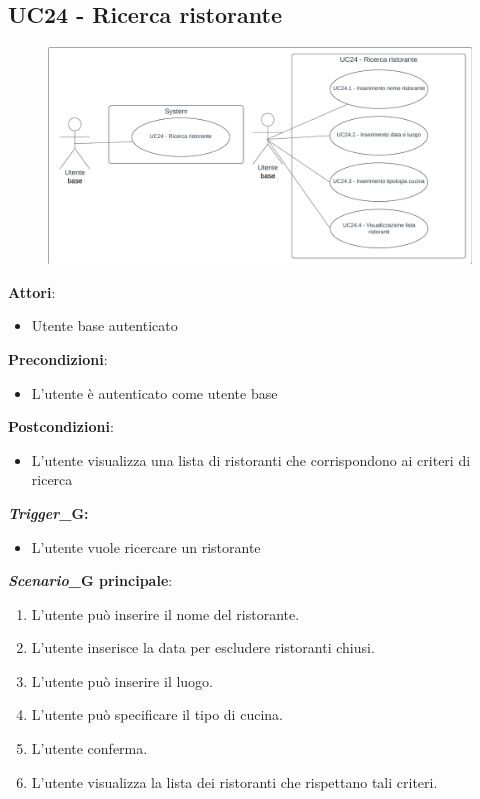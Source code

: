 \subsection{UC24 - Ricerca ristorante}\label{usecase:24}

\begin{figure}[H]
    \centering
    \includegraphics[width=0.9\linewidth]{ucd/UCD24.png}
\end{figure}

\textbf{Attori}:
\begin{itemize}
    \item Utente base autenticato
\end{itemize}
\textbf{Precondizioni}:
\begin{itemize}
    \item L'utente è autenticato come utente base
\end{itemize}
\textbf{Postcondizioni}:
\begin{itemize}
    \item L'utente visualizza una lista di ristoranti che corrispondono ai criteri di ricerca
\end{itemize}
\textbf{\textit{Trigger}_G:}
\begin{itemize}
    \item L'utente vuole ricercare un ristorante
\end{itemize}
\textbf{\textit{Scenario}_G principale}:
\begin{enumerate}
    \item L'utente può inserire il nome del ristorante.
    \item L'utente inserisce la data per escludere ristoranti chiusi.
    \item L'utente può inserire il luogo.
    \item L'utente può specificare il tipo di cucina.
    \item L'utente conferma.
    \item L'utente visualizza la lista dei ristoranti che rispettano tali criteri.
\end{enumerate}

